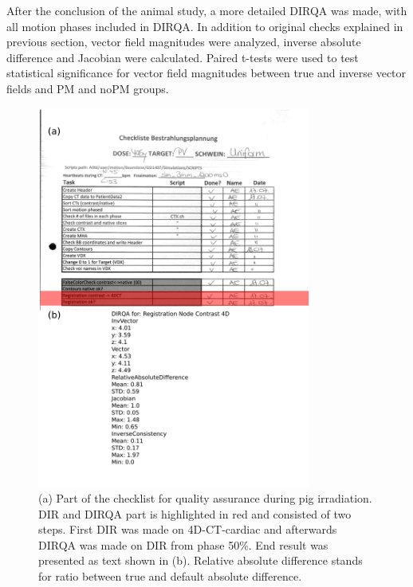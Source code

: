 After the conclusion of the animal study, a more detailed DIRQA was made, with all motion phases included in DIRQA. In addition to original checks explained in previous section, vector field magnitudes were analyzed, inverse absolute difference
and Jacobian were calculated. Paired t-tests were used to test statistical significance for vector field magnitudes between true and inverse vector fields and PM and noPM groups.

\newpage
\begin{figure}[H]
	\begin{center}		
		\includegraphics[width=0.8\textwidth]{./VisualMotionManagment/Images/checkList.png}
		\caption{(a) Part of the checklist for quality assurance during pig irradiation. DIR and DIRQA part is highlighted in red and consisted of two steps. First DIR was made on 4D-CT-cardiac and afterwards DIRQA was made on
		DIR from phase 50\%. End result was presented as text shown in (b). Relative absolute difference stands for ratio between true and default absolute difference.}
		\label{checkList}
	\end{center}
\end{figure}
\newpage
